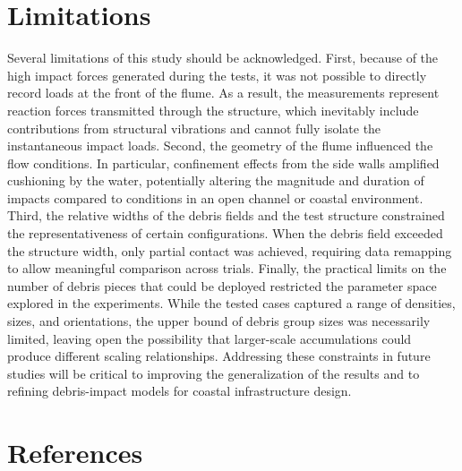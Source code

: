 \documentclass{article}
\begin{document}
\section{Limitations}
Several limitations of this study should be acknowledged. First, because of the high impact forces generated during the tests, it was not possible to directly record loads at the front of the flume. As a result, the measurements represent reaction forces transmitted through the structure, which inevitably include contributions from structural vibrations and cannot fully isolate the instantaneous impact loads. Second, the geometry of the flume influenced the flow conditions. In particular, confinement effects from the side walls amplified cushioning by the water, potentially altering the magnitude and duration of impacts compared to conditions in an open channel or coastal environment. Third, the relative widths of the debris fields and the test structure constrained the representativeness of certain configurations. When the debris field exceeded the structure width, only partial contact was achieved, requiring data remapping to allow meaningful comparison across trials. Finally, the practical limits on the number of debris pieces that could be deployed restricted the parameter space explored in the experiments. While the tested cases captured a range of densities, sizes, and orientations, the upper bound of debris group sizes was necessarily limited, leaving open the possibility that larger-scale accumulations could produce different scaling relationships. Addressing these constraints in future studies will be critical to improving the generalization of the results and to refining debris-impact models for coastal infrastructure design.

\section{References}
  

\end{document}
